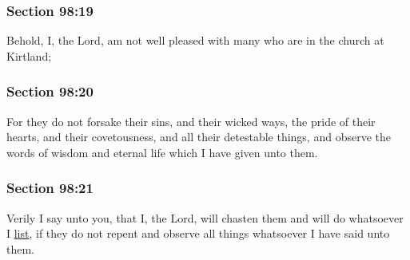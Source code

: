 	\subsubsection{Section 98:19} %
		\label{DC98-19}

		Behold, I, the Lord, am not well pleased with many who are in the church at Kirtland;


	\subsubsection{Section 98:20} %
		\label{DC98-20}

		For they do not forsake their sins, and their wicked ways, the pride of their hearts, and their covetousness, and all their detestable things, and observe the words of wisdom and eternal life which I have given unto them.


	\subsubsection{Section 98:21} %
		\label{DC98-21}

		Verily I say unto you, that I, the Lord, will chasten them and will do whatsoever I \hyperref[LIST]{list}, if they do not repent and observe all things whatsoever I have said unto them.


